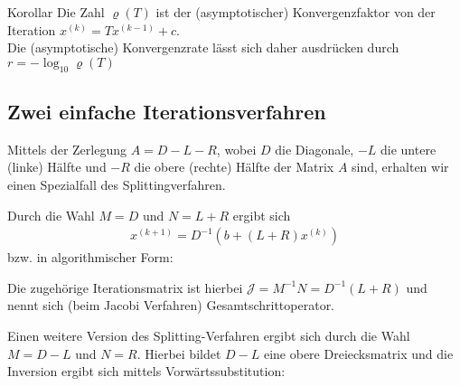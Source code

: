 \begin{colbox}{Korollar} 
  Die Zahl $\varrho(T)$ ist der (asymptotischer) Konvergenzfaktor von der Iteration $x^{(k)}=Tx^{(k-1)}+c$. \\
  Die (asymptotische) Konvergenzrate lässt sich daher ausdrücken durch $r=-\log_{10}\varrho(T)$
\end{colbox}

\subsection{Zwei einfache Iterationsverfahren}

Mittels der Zerlegung $A=D-L-R$, wobei $D$ die Diagonale, $-L$ die untere (linke) Hälfte 
und $-R$ die obere (rechte) Hälfte der Matrix $A$ sind, erhalten wir einen Spezialfall des Splittingverfahren. 

Durch die Wahl $M=D$ und $N=L+R$ ergibt sich 
%
\begin{align*}
  x^{(k+1)}=D^{-1}(b + (L+R)x^{(k)})
\end{align*}
%
bzw. in algorithmischer Form:


Die zugehörige Iterationsmatrix ist hierbei $\mathcal{J}=M^{-1}N = D^{-1}(L+R)$ 
und nennt sich (beim Jacobi Verfahren) Gesamtschrittoperator. 

Einen weitere Version des Splitting-Verfahren ergibt sich durch die Wahl $M=D-L$ und $N=R$.
Hierbei bildet $D-L$ eine obere Dreiecksmatrix und die Inversion ergibt sich mittels Vorwärtssubstitution: 



